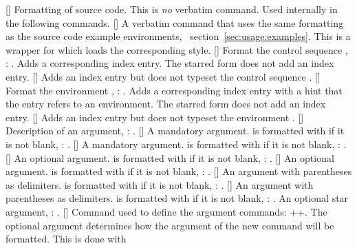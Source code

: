 \documentclass[load-preamble+]{cnltx-doc}
\begin{document}
\begin{commands}
  []
    Formatting of source code.  This is \emph{no} verbatim command.  Used
    internally in the following commands.
  []
    A verbatim command that uses the same formatting as the
    source code example environments, \cf\ section~\ref{sec:usage:examples}.
    This is a wrapper for  which loads the corresponding
    style.
  [\sarg{}]
    Format the control sequence , :
    .  Adds a corresponding index entry.  The starred form does not
    add an index entry.
  []
    Adds an index entry but does not typeset the control sequence
    .
  [\sarg{}]
    Format the environment , :
    .  Adds a corresponding index entry with a hint that the entry
    refers to an environment.  The starred form does not add an index entry.
  []
    Adds an index entry but does not typeset the environment .
  []
    Description of an argument, : .
  []
    A mandatory argument.  is formatted with  if it is not
    blank, : .
  []
    A mandatory argument.  is formatted with
     if it is not blank, : .
  []
    An optional argument.  is formatted with  if it is not
    blank, : .
  []
    An optional argument.  is formatted with
     if it is not blank, : .
  []
    An argument with parentheses as delimiters.  is formatted with
     if it is not blank, : .
  []
    An argument with parentheses as delimiters. 
    is formatted with  if it is not blank, :
    .
    An optional star argument, : \sarg.
  []%
    Command used to define the argument commands:
    \verbcode+\newarg\marg{\{}{\}}+.  The optional argument determines how the
    argument of the new command will be formatted.  This is done with

\end{commands}
\end{document}
